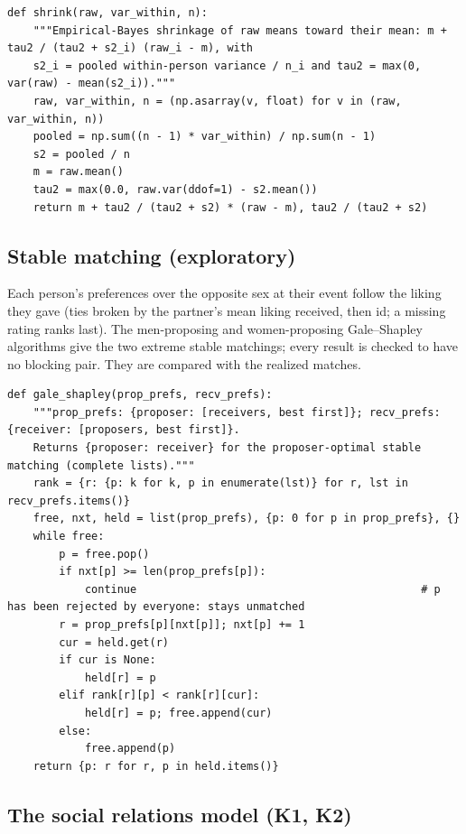 \documentclass[11pt]{article}
\begin{document}
\begin{lstlisting}[caption={Empirical-Bayes shrinkage (scripts/mean\_reversion.py)}]
def shrink(raw, var_within, n):
    """Empirical-Bayes shrinkage of raw means toward their mean: m + tau2 / (tau2 + s2_i) (raw_i - m), with
    s2_i = pooled within-person variance / n_i and tau2 = max(0, var(raw) - mean(s2_i))."""
    raw, var_within, n = (np.asarray(v, float) for v in (raw, var_within, n))
    pooled = np.sum((n - 1) * var_within) / np.sum(n - 1)
    s2 = pooled / n
    m = raw.mean()
    tau2 = max(0.0, raw.var(ddof=1) - s2.mean())
    return m + tau2 / (tau2 + s2) * (raw - m), tau2 / (tau2 + s2)
\end{lstlisting}

\subsection{Stable matching (exploratory)}

Each person's preferences over the opposite sex at their event follow the liking they gave (ties broken by the
partner's mean liking received, then id; a missing rating ranks last). The men-proposing and women-proposing
Gale--Shapley algorithms give the two extreme stable matchings; every result is checked to have no blocking pair.
They are compared with the realized matches.

\begin{lstlisting}[caption={Gale--Shapley deferred acceptance (scripts/stable\_matching.py)}]
def gale_shapley(prop_prefs, recv_prefs):
    """prop_prefs: {proposer: [receivers, best first]}; recv_prefs: {receiver: [proposers, best first]}.
    Returns {proposer: receiver} for the proposer-optimal stable matching (complete lists)."""
    rank = {r: {p: k for k, p in enumerate(lst)} for r, lst in recv_prefs.items()}
    free, nxt, held = list(prop_prefs), {p: 0 for p in prop_prefs}, {}
    while free:
        p = free.pop()
        if nxt[p] >= len(prop_prefs[p]):
            continue                                            # p has been rejected by everyone: stays unmatched
        r = prop_prefs[p][nxt[p]]; nxt[p] += 1
        cur = held.get(r)
        if cur is None:
            held[r] = p
        elif rank[r][p] < rank[r][cur]:
            held[r] = p; free.append(cur)
        else:
            free.append(p)
    return {p: r for r, p in held.items()}
\end{lstlisting}

\subsection{The social relations model (K1, K2)}
\end{document}
